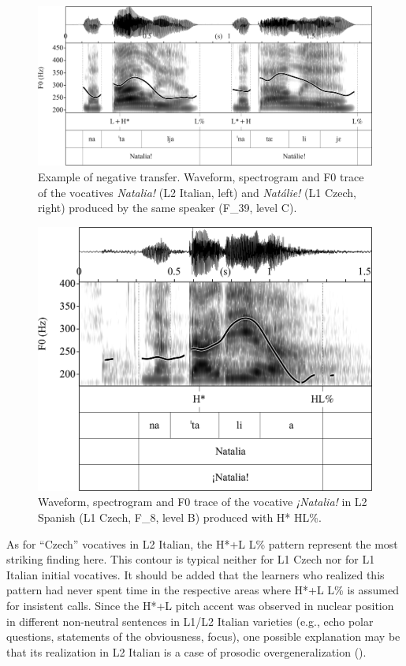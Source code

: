 \begin{figure}

\includegraphics[width=\textwidth]{figures/Figure_4.152.png}



\caption{Example of negative transfer. Waveform, spectrogram and F0 trace of the vocatives \textit{Natalia!} (L2 Italian, left) and \textit{Natálie!} (L1 Czech, right) produced by the same speaker (F\_39, level C).}
\label{fig:4.152}
\end{figure}

\begin{figure}


\includegraphics[width=.8\textwidth]{figures/Figure_4.153.png}



\caption{Waveform, spectrogram and F0 trace of the vocative \textit{¡Natalia!} in L2 Spanish (L1 Czech, F\_8, level B) produced with H* HL\%.}
\label{fig:4.153}
\end{figure}

As for “Czech” vocatives in L2 Italian, the H*+L L\% pattern represent the most striking finding here. This contour is typical neither for L1 Czech nor for L1 Italian initial vocatives. It should be added that the learners who realized this pattern had never spent time in the respective areas where H*+L L\% is assumed for insistent calls. Since the H*+L pitch accent was observed in nuclear position in different non-neutral sentences in L1/L2 Italian varieties (e.g., echo polar questions, statements of the obviousness, focus), one possible explanation may be that its realization in L2 Italian is a case of prosodic overgeneralization ().

